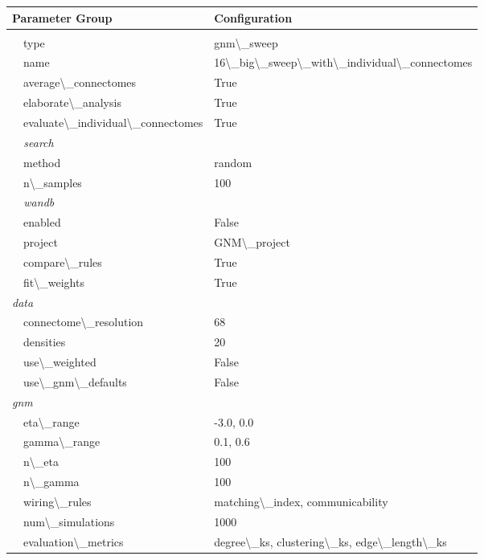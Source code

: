 \documentclass{article}
\begin{document}
\begin{longtable}{ll}
\toprule
\textbf{Parameter Group} & \textbf{Configuration} \\
\midrule
\endhead
\bottomrule
\endfoot
\multicolumn{2}{l}{\textit{experiment}} \\
~~type & gnm\textbackslash{}_sweep \\
~~name & 16\textbackslash{}_big\textbackslash{}_sweep\textbackslash{}_with\textbackslash{}_individual\textbackslash{}_connectomes \\
~~average\textbackslash{}_connectomes & True \\
~~elaborate\textbackslash{}_analysis & True \\
~~evaluate\textbackslash{}_individual\textbackslash{}_connectomes & True \\
\multicolumn{2}{l}{\textit{~~search}} \\
~~method & random \\
~~n\textbackslash{}_samples & 100 \\
\multicolumn{2}{l}{\textit{~~wandb}} \\
~~enabled & False \\
~~project & GNM\textbackslash{}_project \\
~~compare\textbackslash{}_rules & True \\
~~fit\textbackslash{}_weights & True \\
\multicolumn{2}{l}{\textit{data}} \\
~~connectome\textbackslash{}_resolution & 68 \\
~~densities & 20 \\
~~use\textbackslash{}_weighted & False \\
~~use\textbackslash{}_gnm\textbackslash{}_defaults & False \\
\multicolumn{2}{l}{\textit{gnm}} \\
~~eta\textbackslash{}_range & -3.0, 0.0 \\
~~gamma\textbackslash{}_range & 0.1, 0.6 \\
~~n\textbackslash{}_eta & 100 \\
~~n\textbackslash{}_gamma & 100 \\
~~wiring\textbackslash{}_rules & matching\textbackslash{}_index, communicability \\
~~num\textbackslash{}_simulations & 1000 \\
~~evaluation\textbackslash{}_metrics & degree\textbackslash{}_ks, clustering\textbackslash{}_ks, edge\textbackslash{}_length\textbackslash{}_ks \\

\end{longtable}
\end{document}
